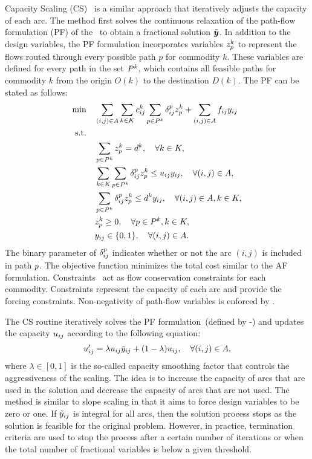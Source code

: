 \documentclass[3p, authoryear, times, doubleblind]{elsarticle}
\begin{document}
{Capacity Scaling (CS)~\citep{katayama_capacity_2009} is a similar approach that iteratively adjusts the capacity of each arc. The method first solves the continuous relaxation of the path-flow formulation (PF) of the \fcn~to obtain a fractional solution $\tilde{\boldsymbol{y}}$. In addition to the design variables, the PF formulation incorporates variables $z^k_p$ to represent the flows routed through every possible path $p$ for commodity $k$. These variables are defined for every path in the set $P^k$, which contains all feasible paths for commodity $k$ from the origin $O(k)$ to the destination $D(k)$. The PF can be stated as follows: 
\begin{align}
    \min \quad &  \sum_{(i,j) \in A}  \sum_{k \in K} c_{ij}^k \sum_{p \in P^k } \delta^p_{ij} z^k_p + \sum_{(i,j) \in A} f_{ij} y_{ij} \label{eq:obj:pf} \\
    \text{s.t.} \quad & \nonumber \\ 
    & \sum_{p \in P^k} z^k_p = d^k,  \quad \forall k \in K, \label{eq:flow:pf} \\
    & \sum_{k \in K} \sum_{p \in P^k} \delta^p_{ij} z^k_p \leq u_{ij} y_{ij},  \quad \forall (i,j) \in A, \label{eq:capacity:pf} \\
    & \sum_{p \in P^k } \delta^p_{ij} z^k_p  \leq  d^k y_{ij}, \quad \forall (i,j) \in A, k \in K, \label{eq:forcing:pf} \\
    & z^k_p \geq 0, \quad \forall p \in P^k, k \in K, \label{eq:nonnegativity:pf} \\
    & y_{ij} \in \{0,1\},\quad \forall (i,j) \in A. \label{eq:binary:pf}
\end{align}
The binary parameter of $\delta^p_{ij}$ indicates whether or not the arc $(i,j)$ is included in path $p$. The objective function  minimizes the total cost similar to the AF formulation. Constraints~ act as flow conservation constraints for each commodity. Constraints  represent the capacity of each arc and  provide the forcing constraints. Non-negativity of path-flow variables is enforced by . %

The CS routine iteratively solves the PF formulation~(defined by -) and updates the capacity $u_{ij}$ according to the following equation:
\begin{align}
    u_{ij}' = \lambda u_{ij} \tilde{y}_{ij} + (1-\lambda)  u_{ij}, \quad \forall (i,j) \in A, 
\end{align}
where $\lambda \in [0,1]$ is the so-called capacity smoothing factor that controls the aggressiveness of the scaling. The idea is to increase the capacity of arcs that are used in the solution and decrease the capacity of arcs that are not used. The method is similar to slope scaling in that it aims to force design variables to be zero or one. If $\tilde{y}_{ij}$ is integral for all arcs, then the solution process stops as the solution is feasible for the original problem. However, in practice, termination criteria are used to stop the process after a certain number of iterations or when the total number of fractional variables is below a given threshold.

}
\end{document}
